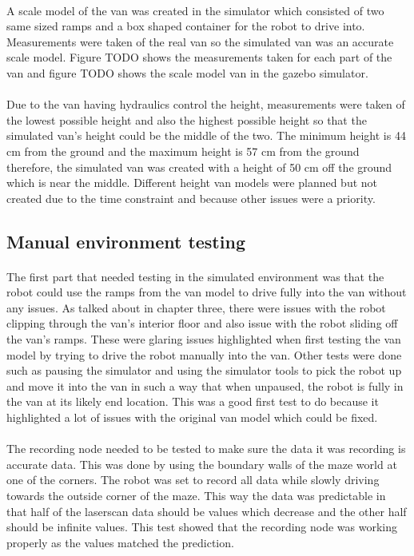 \paragraph{}
A scale model of the van was created in the simulator which consisted of two same sized ramps and a box shaped container for the robot to drive into. Measurements were taken of the real van so the simulated van was an accurate scale model. Figure TODO shows the measurements taken for each part of the van and figure TODO shows the scale model van in the gazebo simulator.

\paragraph{}
Due to the van having hydraulics control the height, measurements were taken of the lowest possible height and also the highest possible height so that the simulated van's height could be the middle of the two. The minimum height is 44 cm from the ground and the maximum height is 57 cm from the ground therefore, the simulated van was created with a height of 50 cm off the ground which is near the middle. Different height van models were planned but not created due to the time constraint and because other issues were a priority.


\subsection{Manual environment testing}
\paragraph{}
The first part that needed testing in the simulated environment was that the robot could use the ramps from the van model to drive fully into the van without any issues. As talked about in chapter three, there were issues with the robot clipping through the van's interior floor and also issue with the robot sliding off the van's ramps. These were glaring issues highlighted when first testing the van model by trying to drive the robot manually into the van. Other tests were done such as pausing the simulator and using the simulator tools to pick the robot up and move it into the van in such a way that when unpaused, the robot is fully in the van at its likely end location. This was a good first test to do because it highlighted a lot of issues with the original van model which could be fixed.

\paragraph{}
The recording node needed to be tested to make sure the data it was recording is accurate data. This was done by using the boundary walls of the maze world at one of the corners. The robot was set to record all data while slowly driving towards the outside corner of the maze. This way the data was predictable in that half of the laserscan data should be values which decrease and the other half should be infinite values. This test showed that the recording node was working properly as the values matched the prediction.

